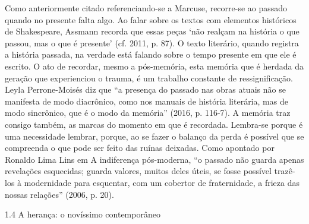 \documentclass[../DISSERTACAO_MAIN.tex]{subfiles}
\begin{document}
Como anteriormente citado referenciando-se a Marcuse, recorre-se ao passado quando no presente falta algo. Ao falar sobre os textos com elementos históricos de Shakespeare, Assmann recorda que essas peças ‘não realçam na história o que passou, mas o que é presente’ (cf. 2011, p. 87). O texto literário, quando registra a história passada, na verdade está falando sobre o tempo presente em que ele é escrito. O ato de recordar, mesmo a pós-memória, esta memória que é herdada da geração que experienciou o trauma, é um trabalho constante de ressignificação. Leyla Perrone-Moisés diz que “a presença do passado nas obras atuais não se manifesta de modo diacrônico, como nos manuais de história literária, mas de modo sincrônico, que é o modo da memória” (2016, p. 116-7). A memória traz consigo também, as marcas do momento em que é recordada. Lembra-se porque é uma necessidade lembrar, porque, ao se fazer o balanço da perda é possível que se compreenda o que pode ser feito das ruínas deixadas. Como apontado por Ronaldo Lima Lins em A indiferença pós-moderna, “o passado não guarda apenas revelações esquecidas; guarda valores, muitos deles úteis, se fosse possível trazê-los à modernidade para esquentar, com um cobertor de fraternidade, a frieza das nossas relações” (2006, p. 20).

1.4  A herança: o novíssimo contemporâneo
\end{document}
